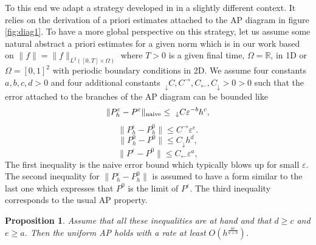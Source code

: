 \documentclass[a4paper,french,english,10pt]{article}
\newcommand\eps{\varepsilon}
\newtheorem{pro}[theorem]{Proposition}
\begin{document}
To this end we adapt a strategy developed in 
 \cite{cveps} in a slightly different context.
It relies on the derivation of a priori estimates attached to the AP diagram in figure
\ref{fig:diag1}. To have a more global perspective
on this strategy,  let us assume 
some natural abstract a priori  estimates for a given norm
which is in our work based on   $\|f\|=\|f\|_{L^2([0,T]\times \Omega ) }$
where $T>0$ is a given final time, $\Omega=\mathbb{R}$, in 1D or $\Omega=[0,1]^2$ with periodic boundary conditions in 2D.
We assume four  constants $a,b,c,d>0$ and four  additional  constants $~_\downarrow C, C ^\rightarrow  ,C_\leftarrow,  C_\downarrow>0>0$ 
 such that the error attached to the branches of the AP diagram can be bounded like  
 \begin{equation}\label{eq:mod7}
\| P_h^\varepsilon - P^\varepsilon   \|_{ {\rm naive}} \leq~_\downarrow C \varepsilon ^{-b}h^c, %
\end{equation}
\begin{equation}\label{eq:mod3-bis}
\| P^\varepsilon_h - P^0_h \| \leq
C ^\rightarrow  \varepsilon ^{e}. %
\end{equation}
\begin{equation}\label{eq:mod4}
\| P_h^0 - P^0   \| \leq
C_\downarrow  h^d,  %
\end{equation}
\begin{equation}\label{eq:mod3}
\| P^\varepsilon - P^0 \| \leq
C_\leftarrow  \varepsilon ^{a},     %
\end{equation}
 The first inequality is  the naive error bound which typically blows up for small $\varepsilon$.
The second inequality 
for
$\| P_h^\eps-P_h^0\|$ 
is 
assumed to have  a form similar to the last one which  expresses that $P^0$ is  the limit of
$P^\varepsilon$. 
The third inequality corresponds to  the usual AP property.


\begin{pro} \label{prop:1}
 Assume that all these inequalities are at 
hand and that $d\geq c$ and $e\geq a$.
 Then the uniform AP holds with a rate at least
$O\left(h{^\frac{ac}{a+b}  } \right)$.
\end{pro}
\end{document}
